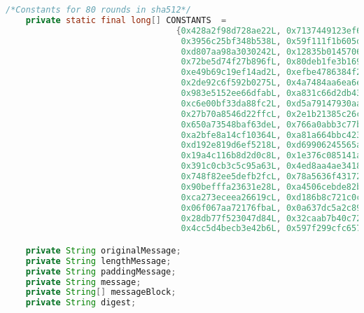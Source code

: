 \begin{lstlisting}[language=Java,basicstyle=\tiny,caption=Sha512.java]
    /*Constants for 80 rounds in sha512*/
    private static final long[] CONSTANTS  =
                                  {0x428a2f98d728ae22L, 0x7137449123ef65cdL, 0xb5c0fbcfec4d3b2fL, 0xe9b5dba58189dbbcL,
                                   0x3956c25bf348b538L, 0x59f111f1b605d019L, 0x923f82a4af194f9bL, 0xab1c5ed5da6d8118L,
                                   0xd807aa98a3030242L, 0x12835b0145706fbeL, 0x243185be4ee4b28cL, 0x550c7dc3d5ffb4e2L,
                                   0x72be5d74f27b896fL, 0x80deb1fe3b1696b1L, 0x9bdc06a725c71235L, 0xc19bf174cf692694L,
                                   0xe49b69c19ef14ad2L, 0xefbe4786384f25e3L, 0x0fc19dc68b8cd5b5L, 0x240ca1cc77ac9c65L,
                                   0x2de92c6f592b0275L, 0x4a7484aa6ea6e483L, 0x5cb0a9dcbd41fbd4L, 0x76f988da831153b5L,
                                   0x983e5152ee66dfabL, 0xa831c66d2db43210L, 0xb00327c898fb213fL, 0xbf597fc7beef0ee4L,
                                   0xc6e00bf33da88fc2L, 0xd5a79147930aa725L, 0x06ca6351e003826fL, 0x142929670a0e6e70L,
                                   0x27b70a8546d22ffcL, 0x2e1b21385c26c926L, 0x4d2c6dfc5ac42aedL, 0x53380d139d95b3dfL,
                                   0x650a73548baf63deL, 0x766a0abb3c77b2a8L, 0x81c2c92e47edaee6L, 0x92722c851482353bL,
                                   0xa2bfe8a14cf10364L, 0xa81a664bbc423001L, 0xc24b8b70d0f89791L, 0xc76c51a30654be30L,
                                   0xd192e819d6ef5218L, 0xd69906245565a910L, 0xf40e35855771202aL, 0x106aa07032bbd1b8L,
                                   0x19a4c116b8d2d0c8L, 0x1e376c085141ab53L, 0x2748774cdf8eeb99L, 0x34b0bcb5e19b48a8L,
                                   0x391c0cb3c5c95a63L, 0x4ed8aa4ae3418acbL, 0x5b9cca4f7763e373L, 0x682e6ff3d6b2b8a3L,
                                   0x748f82ee5defb2fcL, 0x78a5636f43172f60L, 0x84c87814a1f0ab72L, 0x8cc702081a6439ecL,
                                   0x90befffa23631e28L, 0xa4506cebde82bde9L, 0xbef9a3f7b2c67915L, 0xc67178f2e372532bL,
                                   0xca273eceea26619cL, 0xd186b8c721c0c207L, 0xeada7dd6cde0eb1eL, 0xf57d4f7fee6ed178L,
                                   0x06f067aa72176fbaL, 0x0a637dc5a2c898a6L, 0x113f9804bef90daeL, 0x1b710b35131c471bL,
                                   0x28db77f523047d84L, 0x32caab7b40c72493L, 0x3c9ebe0a15c9bebcL, 0x431d67c49c100d4cL,
                                   0x4cc5d4becb3e42b6L, 0x597f299cfc657e2aL, 0x5fcb6fab3ad6faecL, 0x6c44198c4a475817L};

    private String originalMessage;
    private String lengthMessage;
    private String paddingMessage;
    private String message;
    private String[] messageBlock;
    private String digest;


\end{lstlisting}
